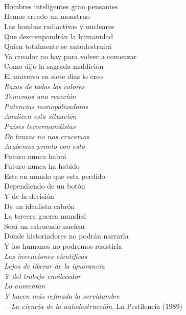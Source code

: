\newpage
\thispagestyle{empty} \textbf{}\normalsize
\\\\\\%

\begin{flushright}
\begin{minipage}{10cm}
    \noindent
    \small
    Hombres inteligentes gran pensantes\\
    Hemos creado un monstruo\\
    Las bombas radiactivas y nucleares\\
    Que descompondrán la humanidad\\
    Quien totalmente se autodestruirá\\
    
    Ya creador no hay para volver a comenzar\\
    Como dijo la sagrada maldición\\
    El universo en siete días lo creo\\
    
    \emph{Razas de todos los colores\\
    Tomemos una reacción\\
    Potencias monopolizadoras\\
    Analicen esta situación\\
    Países tercermundistas\\
    De brazos no nos crucemos\\
    Acabemos pronto con esto}\\
    
    Futuro nunca habrá\\
    Futuro nunca ha habido\\
    Este en mundo que esta perdido\\
    Dependiendo de un botón\\
    Y de la decisión\\
    De un idealista cabrón\\
    
    La tercera guerra mundial\\
    Será un estruendo nuclear\\
    Donde historiadores no podrán narrarla\\
    Y los humanos no podremos resistirla\\
    
    \emph{Las invenciones científicas\\
    Lejos de liberar de la ignorancia\\
    Y del trabajo envilecedor\\
    Lo aumentan\\
    Y hacen más refinada la servidumbre}\\
    
    ---\emph{La ciencia de la autodestrucción}, La Pestilencia (1989)\\
\end{minipage}
\end{flushright}

